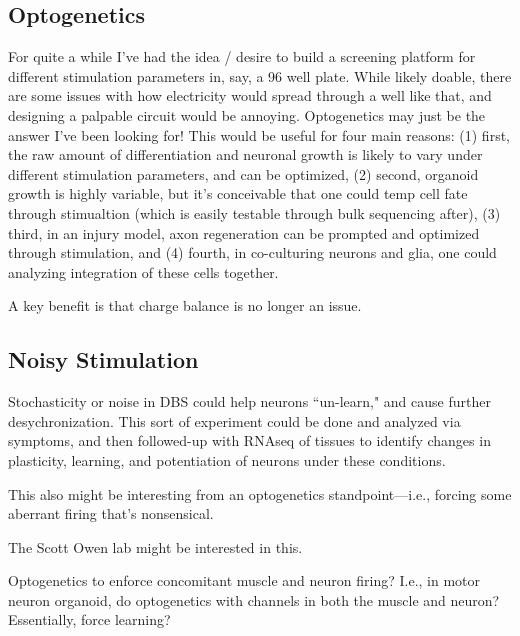 \subsection{Optogenetics}

For quite a while I've had the idea / desire to build a screening platform for different stimulation parameters in, say, a 96 well plate. While likely doable, there are some issues with how electricity would spread through a well like that, and designing a palpable circuit would be annoying. Optogenetics may just be the answer I've been looking for! This would be useful for four main reasons: (1) first, the raw amount of differentiation and neuronal growth is likely to vary under different stimulation parameters, and can be optimized, (2) second, organoid growth is highly variable, but it's conceivable that one could temp cell fate through stimualtion (which is easily testable through bulk sequencing after), (3) third, in an injury model, axon regeneration can be prompted and optimized through stimulation, and (4) fourth, in co-culturing neurons and glia, one could analyzing integration of these cells together. 

A key benefit is that charge balance is no longer an issue.


\subsection{Noisy Stimulation}
Stochasticity or noise in DBS could help neurons ``un-learn," and cause further desychronization. This sort of experiment could be done and analyzed via symptoms, and then followed-up with RNAseq of tissues to identify changes in plasticity, learning, and potentiation of neurons under these conditions. \newline

This also might be interesting from an optogenetics standpoint---i.e., forcing some aberrant firing that's nonsensical. \newline

The Scott Owen lab might be interested in this. 

Optogenetics to enforce concomitant muscle and neuron firing? I.e., in motor neuron organoid, do optogenetics with channels in both the muscle and neuron? Essentially, force learning? 



